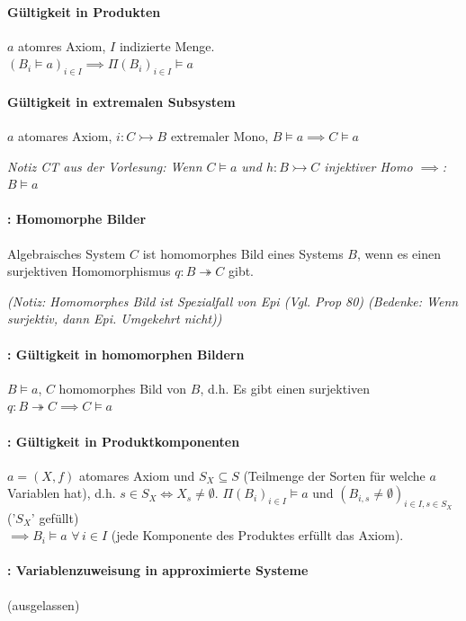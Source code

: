 \paragraph{ Gültigkeit in Produkten}
$a$ atomres Axiom, $I$ indizierte Menge. \\$(B_i \models a)_{i \in I} \implies \Pi(B_i)_{i \in I} \models a$


\paragraph{ Gültigkeit in extremalen Subsystem}
$a$ atomares Axiom, $i: C \rightarrowtail B$ extremaler Mono, $B \models a \implies C \models a$

\emph{Notiz CT aus der Vorlesung: Wenn $C \models a$ und $h: B \rightarrowtail C$ injektiver Homo $\implies$: $B \models a$}

\paragraph{: Homomorphe Bilder }
Algebraisches System $C$ ist homomorphes Bild eines Systems $B$, wenn es einen surjektiven Homomorphismus $q: B \twoheadrightarrow C$ gibt.

\emph{(Notiz: Homomorphes Bild ist Spezialfall von Epi (Vgl. Prop 80) (Bedenke: Wenn surjektiv, dann Epi. Umgekehrt nicht)) }


\paragraph{: Gültigkeit in homomorphen Bildern}
$B \models a$, $C$ homomorphes Bild von $B$, d.h. Es gibt einen surjektiven \homo $q: B \twoheadrightarrow C \implies C \models a$



\paragraph{: Gültigkeit in Produktkomponenten}
$a = (X,f)$ atomares Axiom und $S_X \subseteq S$ (Teilmenge der Sorten für welche $a$ Variablen hat), d.h. $s \in S_X \Leftrightarrow X_s \neq \emptyset$.
$\Pi (B_i)_{i \in I} \models a$ und $(B_{i,s} \neq \emptyset)_{i \in I, s \in S_X}$ ('$S_X$' gefüllt) \\
$\implies  B_i \models a \, \, \forall \,  i \in I $ (jede Komponente des Produktes erfüllt das Axiom).

\paragraph{: Variablenzuweisung in approximierte Systeme}
(ausgelassen)

